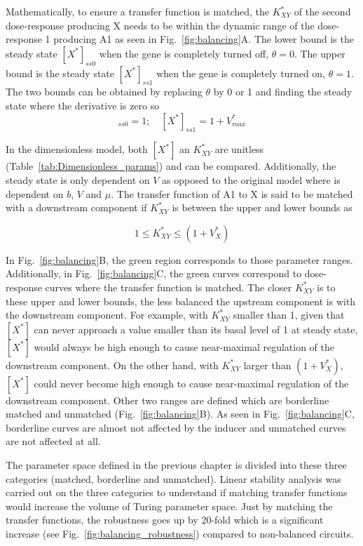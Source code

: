 Mathematically, to ensure a transfer function is matched,
the $K^*_{XY}$ of the second dose-response producing X needs
to be within the dynamic range of the dose-response 1 producing A1 as seen in Fig.~\ref{fig:balancing}A.
The lower bound is the steady state $[X^*]_{ss0}$ when the gene is completely turned off, $\theta=0$.
The upper bound is the steady state $[X^*]_{ss1}$ when the gene is completely turned on, $\theta=1$.
The two bounds can be obtained
by replacing $\theta$ by 0 or 1 and finding the steady state where the derivative is zero so
\begin{equation}
    [X^*]_{ss0}=1; \quad [X^*]_{ss1}=1+V^*_{max}
    \label{1toVmax}
\end{equation}


In the dimensionless model,
both $[X^*]$ an $K^*_{XY}$ are unitless (Table~\ref{tab:Dimensionless_params}) and can be compared. Additionally, the steady state is only dependent on $V$ as opposed to the original model where is dependent on $b$, $V$ and $\mu$.
The transfer function of A1 to X is said
to be matched with a downstream component if $K^*_{XY}$ is between the upper and lower bounds as

\begin{equation}
    1 \leq K^*_{XY} \leq (1+V^*_{X})
\end{equation}

In Fig.~\ref{fig:balancing}B, the green region corresponds to those parameter ranges.
Additionally, in Fig.~\ref{fig:balancing}C,
the green curves correspond to dose-response curves where the transfer function is matched.
The closer $K^*_{XY}$ is to these upper and lower bounds,
the less balanced the upstream component is with the downstream component.
For example, with $K^*_{XY}$ smaller than 1,
given that $[X^*]$ can never approach a value smaller than its basal level of 1 at steady state, $[X^*]$
would always be high enough to cause near-maximal regulation of the downstream component.
On the other hand, with $K^*_{XY}$ larger than $(1+V^*_{X})$, $[X^*]$
could never become high enough to cause near-maximal regulation of the downstream component.
Other two ranges are defined which are borderline matched and unmatched (Fig.~\ref{fig:balancing}B).
As seen in Fig.~\ref{fig:balancing}C,
borderline curves are almost not affected by the inducer and unmatched curves are not affected at all.

The parameter space defined in the previous chapter is divided into these three categories
(matched, borderline and unmatched).
Linear stability analysis was carried out on the three categories
to understand if matching transfer functions would increase the volume of Turing parameter space.
Just by matching the transfer functions,
the robustness goes up by 20-fold which is a significant increase
(see Fig.~\ref{fig:balancing_robustness}) compared to non-balanced circuits.


